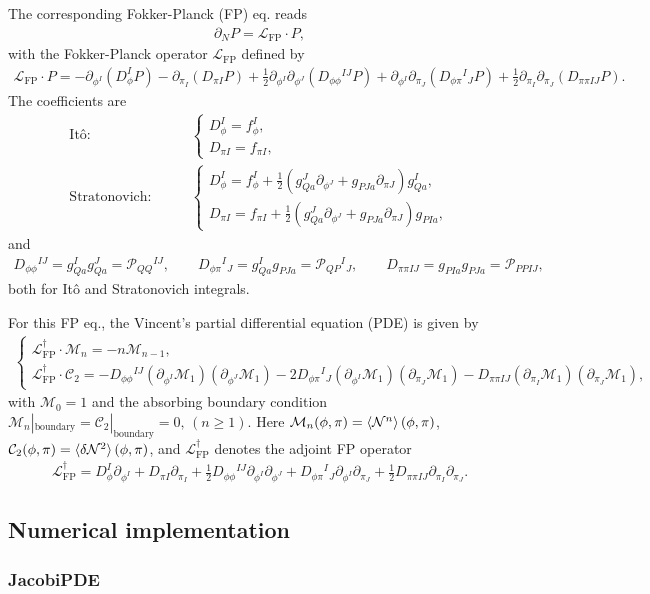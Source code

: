 \documentclass[aps, prd
, preprint
, nofootinbib 
, longbibliography
]{revtex4-1}
\newcommand{\dps}{\displaystyle}
\newcommand{\FP}{\text{FP}}
\newcommand{\calC}{\mathcal{C}}
\newcommand{\calL}{\mathcal{L}}
\newcommand{\calM}{\mathcal{M}}
\newcommand{\calN}{\mathcal{N}}
\newcommand{\calP}{\mathcal{P}}
\newcommand{\bae}[1]{\begin{align} #1 \end{align}}
\newcommand{\bce}[1]{\begin{cases} #1 \end{cases}}
\begin{document}
The corresponding Fokker-Planck (FP) eq. reads
\bae{
	\partial_NP=\calL_{\FP}\cdot P,
}
with the Fokker-Planck operator $\calL_{\FP}$ defined by
\bae{
	\calL_{\FP}\cdot P=-\partial_{\phi^I}(D_{\phi}^IP)-\partial_{\pi_I}(D_{\pi I}P)+\frac{1}{2}\partial_{\phi^I}\partial_{\phi^J}(D_{\phi\phi}{}^{IJ}P)
	+\partial_{\phi^I}\partial_{\pi_J}(D_{\phi\pi}{}^I{}_JP)+\frac{1}{2}\partial_{\pi_I}\partial_{\pi_J}(D_{\pi\pi IJ}P).
}
The coefficients are
\bae{
	\text{It\^o:}& \qquad
	\bce{
		\dps
		D_\phi^I=f_\phi^I, \\
		\dps
		D_{\pi I}=f_{\pi I},
	} \\
	\text{Stratonovich:}& \qquad
	\bce{
		\dps
		D_\phi^I=f_\phi^I+\frac{1}{2}(g^J_{Qa}\partial_{\phi^J}+g_{PJa}\partial_{\pi J})g^I_{Qa}, \\
		D_{\pi I}=f_{\pi I}+\frac{1}{2}(g^J_{Qa}\partial_{\phi^J}+g_{PJa}\partial_{\pi J})g_{PIa}, 
	}
}
and
\bae{
	D_{\phi\phi}{}^{IJ}=g^I_{Qa}g^J_{Qa}=\calP_{QQ}{}^{IJ}, \qquad D_{\phi\pi}{}^I{}_J=g^I_{Qa}g_{PJa}=\calP_{QP}{}^I{}_J, \qquad 
	D_{\pi\pi IJ}=g_{PIa}g_{PJa}=\calP_{PPIJ},
}
both for It\^o and Stratonovich integrals.

For this FP eq., the Vincent's partial differential equation (PDE) is given by
\bae{
	\bce{
		\dps
		\calL_\FP^\dagger\cdot \calM_n=-n\calM_{n-1}, \\ 
		\dps
		\calL_\FP^\dagger\cdot \calC_2=-D_{\phi\phi}{}^{IJ}(\partial_{\phi^I}\calM_1)(\partial_{\phi^J}\calM_1)
		-2D_{\phi\pi}{}^I{}_J(\partial_{\phi^I}\calM_1)(\partial_{\pi_J}\calM_1)-D_{\pi\pi IJ}(\partial_{\pi_I}\calM_1)(\partial_{\pi_J}\calM_1),
	}
}
with $\calM_0=1$ and the absorbing boundary condition $\calM_n|_\text{boundary}=\calC_2|_\text{boundary}=0,\,(n\ge1)$. 
Here $\calM_n(\phi,\pi)=\braket{\calN^n}(\phi,\pi)$, $\calC_2(\phi,\pi)=\braket{\delta\calN^2}(\phi,\pi)$,
and $\calL^\dagger_\FP$ denotes the adjoint FP operator 
\bae{
	\calL^\dagger_\FP=D_\phi^I\partial_{\phi^I}+D_{\pi I}\partial_{\pi_I}+\frac{1}{2}D_{\phi\phi}{}^{IJ}\partial_{\phi^I}\partial_{\phi^J}+D_{\phi\pi}{}^I{}_J\partial_{\phi^I}\partial_{\pi_J}
	+\frac{1}{2}D_{\pi\pi IJ}\partial_{\pi_I}\partial_{\pi_J}.
}



\subsection{Numerical implementation}

\subsubsection{JacobiPDE}
\end{document}
